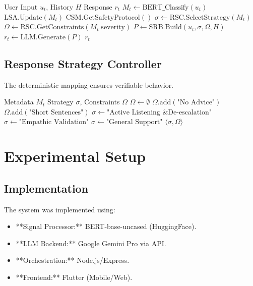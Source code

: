 \documentclass[conference]{IEEEtran}
\begin{document}
\begin{algorithm}
\caption{Multi-Stage Processing Pipeline (MSPP)}
\begin{algorithmic}[1]
\REQUIRE User Input $u_t$, History $H$
\ENSURE Response $r_t$
\STATE $M_t \leftarrow \text{BERT\_Classify}(u_t)$
\STATE $\text{LSA}.\text{Update}(M_t)$
    \RETURN $\text{CSM}.\text{GetSafetyProtocol}()$
\ENDIF
\STATE $\sigma \leftarrow \text{RSC}.\text{SelectStrategy}(M_t)$
\STATE $\Omega \leftarrow \text{RSC}.\text{GetConstraints}(M_t.\text{severity})$
\STATE $P \leftarrow \text{SRB}.\text{Build}(u_t, \sigma, \Omega, H)$
\STATE $r_t \leftarrow \text{LLM}.\text{Generate}(P)$
\RETURN $r_t$
\end{algorithmic}
\end{algorithm}

\subsection{Response Strategy Controller}
The deterministic mapping ensures verifiable behavior.

\begin{algorithm}
\caption{Response Strategy Controller (RSC)}
\begin{algorithmic}[1]
\REQUIRE Metadata $M_t$
\ENSURE Strategy $\sigma$, Constraints $\Omega$
\STATE $\Omega \leftarrow \emptyset$
    \STATE $\Omega.\text{add}(\text{"No Advice"}) $
    \STATE $\Omega.\text{add}(\text{"Short Sentences"}) $
\ENDIF
{}
        \STATE $\sigma \leftarrow \text{"Active Listening \& De-escalation"}$
    \ENDCASE
        \STATE $\sigma \leftarrow \text{"Empathic Validation"}$
    \ENDCASE
    \DEFAULT
        \STATE $\sigma \leftarrow \text{"General Support"}$
    \ENDDEFAULT
\ENDSWITCH
\RETURN $\langle \sigma, \Omega \rangle$
\end{algorithmic}
\end{algorithm}

\section{Experimental Setup}

\subsection{Implementation}
The system was implemented using:
\begin{itemize}
    \item **Signal Processor:** BERT-base-uncased (HuggingFace).
    \item **LLM Backend:** Google Gemini Pro via API.
    \item **Orchestration:** Node.js/Express.
    \item **Frontend:** Flutter (Mobile/Web).
\end{itemize}
\end{document}
